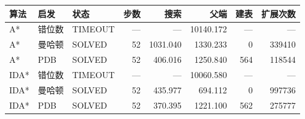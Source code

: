 \begin{tabular}{lllrrrrr}
\hline
\textbf{算法} & \textbf{启发} & \textbf{状态} & \textbf{步数} & \textbf{搜索} & \textbf{父端} & \textbf{建表} & \textbf{扩展次数} \\
\hline
A* & 错位数 & TIMEOUT & --- & --- & 10140.172 & --- & --- \\
A* & 曼哈顿 & SOLVED & 52 & 1031.040 & 1330.233 & 0 & 339410 \\
A* & PDB & SOLVED & 52 & 406.016 & 1250.840 & 564 & 118544 \\
IDA* & 错位数 & TIMEOUT & --- & --- & 10060.580 & --- & --- \\
IDA* & 曼哈顿 & SOLVED & 52 & 435.977 & 694.112 & 0 & 997736 \\
IDA* & PDB & SOLVED & 52 & 370.395 & 1221.100 & 562 & 275777 \\
\hline
\end{tabular}
